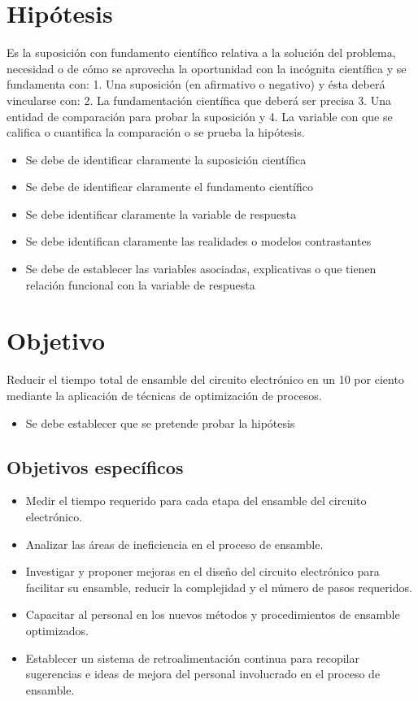     \section{Hipótesis}
    
    Es la suposición con fundamento científico relativa a la solución del problema, necesidad o de cómo se aprovecha la oportunidad con la incógnita científica y se fundamenta con: 1. Una suposición (en afirmativo o negativo) y ésta deberá vincularse con:
    2. La fundamentación científica que deberá ser precisa 3. Una entidad de comparación para probar la suposición y
    4. La variable con que se califica o cuantifica la comparación o se prueba la hipótesis.
    
    \begin{itemize}
        \item Se debe de identificar claramente la suposición científica
        \item Se debe de identificar claramente el fundamento científico
        \item Se debe identificar claramente la variable de respuesta
        \item Se debe identifican claramente las realidades o modelos contrastantes
        \item Se debe de establecer las variables asociadas, explicativas o que tienen relación funcional con la variable de respuesta
    \end{itemize}
    \section{Objetivo}Reducir el tiempo total de ensamble del circuito electrónico en un 10 por ciento mediante la aplicación de técnicas de optimización de procesos.
    \begin{itemize}
        \item Se debe establecer que se pretende probar la hipótesis
    \end{itemize}
    
    \subsection{Objetivos específicos }
    
    \begin{itemize}
        \item Medir el tiempo requerido para cada etapa del ensamble del circuito electrónico.
        \item Analizar las áreas de ineficiencia en el proceso de ensamble.
        \item Investigar y proponer mejoras en el diseño del circuito electrónico para facilitar su ensamble, reducir la complejidad y el número de pasos requeridos.
        \item Capacitar al personal en los nuevos métodos y procedimientos de ensamble optimizados.
        \item Establecer un sistema de retroalimentación continua para recopilar sugerencias e ideas de mejora del personal involucrado en el proceso de ensamble.
    
    \end{itemize}
    
